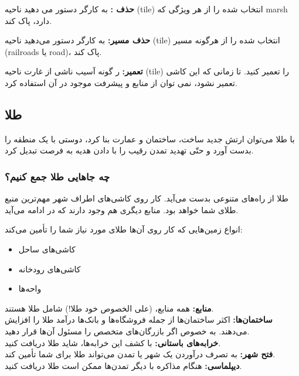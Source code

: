 \documentclass[]{article}
\begin{document}
\noindent \textbf{حذف :} به کارگر دستور می دهید ناحیه‌ (tile) انتخاب شده را از هر ویژگی که marsh دارد، پاک کند.

\noindent \textbf{حذف مسیر:} به کارگر دستور می‌دهید ناحیه‌ (tile) انتخاب شده را از هرگونه مسیر (railroads یا road)، پاک کند.

\noindent \textbf{تعمیر:} ر گونه آسیب ناشی از غارت ناحیه‌ (tile) را تعمیر کنید. تا زمانی که این کاشی تعمیر نشود، نمی توان از منابع و پیشرفت موجود در آن استفاده کرد.



\subsection*{{\titr طلا}}
با طلا می‌توان ارتش جدید ساخت، ساختمان و عمارت بنا کرد، دوستی با یک منطقه را بدست آورد و حتّی تهدید تمدن رقیب را با دادن هدیه به فرصت تبدیل کرد.
\subsubsection*{{\titr چه جاهایی طلا جمع کنیم؟}}
طلا از راه‌های متنوعی بدست می‌آید. کار روی کاشی‌های اطراف شهر مهم‌ترین منبع طلای شما خواهد بود. منابع دیگری هم وجود دارند که در ادامه می‌آید.

انواع زمین‌هایی که کار روی آن‌ها طلای مورد نیاز شما را تأمین می‌کند:
\begin{itemize}
	\item کاشی‌های ساحل
	\item کاشی‌های رودخانه
	\item واحه‌ها
\end{itemize}
\noindent \textbf{منابع:} همه منابع، (علی الخصوص خود طلا!) شامل طلا هستند.
\\\noindent \textbf{ساختمان‌ها:} اکثر ساختمان‌ها از جمله فروشگاه‌ها و بانک‌ها درآمد طلا را افزایش می‌دهند. به خصوص اگر بازرگان‌های متخصص را مسئول آن‌ها قرار دهید.
\\\noindent \textbf{خرابه‌های باستانی:} با کشف این خرابه‌ها، شاید طلا دریافت کنید.
\\\noindent \textbf{فتح شهر:} به تصرف درآوردن یک شهر یا تمدن می‌تواند طلا برای شما تأمین کند.
\\\noindent \textbf{دیپلماسی:} هنگام مذاکره با دیگر تمدن‌ها ممکن است طلا دریافت کنید.
\end{document}
